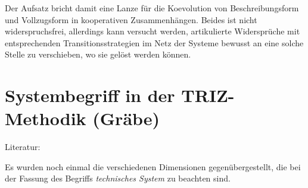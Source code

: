 \documentclass[11pt,a4paper]{article}
\begin{document}
Der Aufsatz bricht damit eine Lanze für die Koevolution von Beschreibungsform
und Vollzugsform in kooperativen Zusammenhängen.  Beides ist nicht
widerspruchsfrei, allerdings kann versucht werden, artikulierte Widersprüche
mit entsprechenden Transitionsstrategien im Netz der Systeme bewusst an eine
solche Stelle zu verschieben, wo sie gelöst werden können.

\section{Systembegriff in der TRIZ-Methodik (Gräbe)}

Literatur: \cite{Koltze2017}

Es wurden noch einmal die verschiedenen Dimensionen gegenübergestellt, die bei
der Fassung des Begriffs \emph{technisches System} zu beachten sind.
\end{document}
